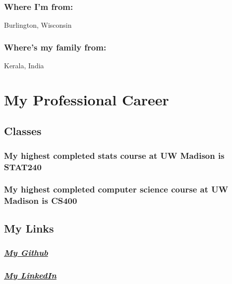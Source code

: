 \documentclass[
  letterpaper,
  DIV=11,
  numbers=noendperiod]{scrartcl}
\begin{document}
\subsubsection{Where I'm from:}\label{where-im-from}

Burlington, Wisconsin

\subsubsection{Where's my family from:}\label{wheres-my-family-from}

Kerala, India

\section{My Professional Career}\label{my-professional-career}

\subsection{Classes}\label{classes}

\subsubsection{My highest completed stats course at UW Madison is
STAT240}\label{my-highest-completed-stats-course-at-uw-madison-is-stat240}

\subsubsection{My highest completed computer science course at UW
Madison is
CS400}\label{my-highest-completed-computer-science-course-at-uw-madison-is-cs400}

\subsection{My Links}\label{my-links}

\subsubsection{\texorpdfstring{\emph{\href{https://github.com/BenJPanackal?tab=repositories}{My
Github}}}{My Github}}\label{my-github}

\subsubsection{\texorpdfstring{\emph{\href{https://www.linkedin.com/in/benjamin-panackal-99aa95386/}{My
LinkedIn}}}{My LinkedIn}}\label{my-linkedin}
\end{document}
